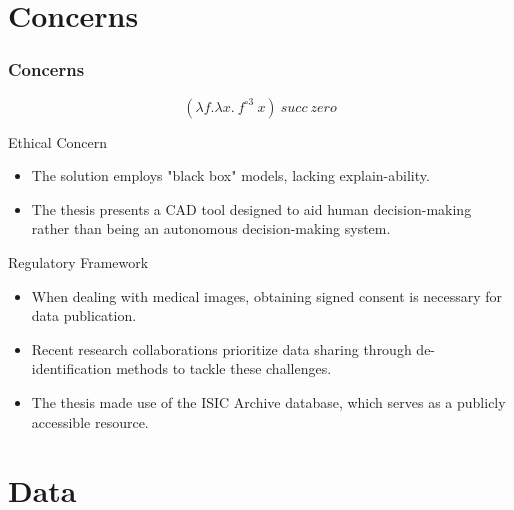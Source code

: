 \documentclass[dvipsnames,mathserif]{beamer}
\begin{document}
{\begin{frame}
    \end{frame}





    \section{Concerns}


    \begin{frame}
      \frametitle{Concerns}

      \[(\lambda f. \lambda x.\ f^{\circ 3}\ x)\ succ\ zero\]
    \end{frame}

    \begin{frame}
      \large Ethical Concern
      \vspace{0.25cm}

      \footnotesize
      \begin{itemize}
        \item The solution employs "black box" models, lacking explain-ability.
        \item The thesis presents a CAD tool designed to aid human decision-making
          rather than being an autonomous decision-making system.
      \end{itemize}
    \end{frame}

    \begin{frame}

      \large Regulatory Framework
      \vspace{0.25cm}

      \footnotesize

      \begin{itemize}
        \item When dealing with medical images, obtaining signed consent is
          necessary for data publication.
        \item Recent research collaborations prioritize data sharing through
          de-identification methods to tackle these challenges.
        \item The thesis made use of the ISIC Archive database, which serves as
          a publicly accessible resource.
      \end{itemize}


    \end{frame}



    \section{Data}

}
\end{document}
